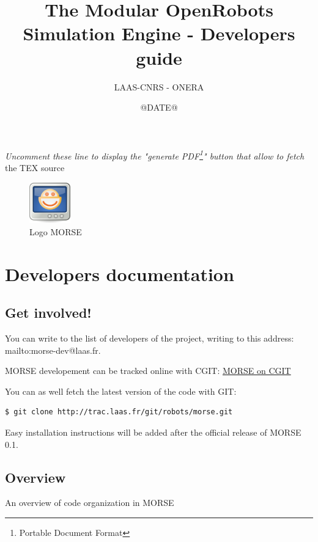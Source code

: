 \documentclass[twoside,a4paper,10pt]{report}
\title{The Modular OpenRobots Simulation Engine - Developers guide}
\author{LAAS-CNRS - ONERA}
\date{@DATE@}
\newcommand{\dokutitlelevelone}[1]{\chapter{#1}}
\newcommand{\dokutitleleveltwo}[1]{\section{#1}}
\newcommand{\dokufootnote}[1]{\footnote{#1}}
\newcommand{\dokuitalic}[1]{\textsl{#1}}
\begin{document}
\sffamily
\allsectionsfont{\sffamily}


\thispagestyle{empty}
\maketitle
\thispagestyle{empty}
\cleardoublepage
\tableofcontents
\newpage
\thispagestyle{plain}
\cleardoublepage
\newpage
\dokuitalic{Uncomment these line to display the "generate PDF\dokufootnote{Portable Document Format}" button that allow to fetch
}the TEX source


\begin{figure}[h]
\centering
\includegraphics[width=50pt]{openrobots-simulator.png}
\caption{Logo MORSE}
\end{figure}




\dokutitlelevelone{Developers documentation}
\label{cdb0de77c6812018f32abbd4e86045e9}%
\label{a80da1282f2c775bbc5f2c92c836968b}%

\dokutitleleveltwo{Get involved!}
\label{9250253a562d7334a71ae2812a91d3bd}%

You can write to the list of developers of the project, writing to this address: mailto:morse-dev@laas.fr.

MORSE developement can be tracked online with CGIT: \href{http://trac.laas.fr/git/morse}{ MORSE on CGIT}

You can as well fetch the latest version of the code with GIT:



\lstset{language=TeX}
\begin{lstlisting}
$ git clone http://trac.laas.fr/git/robots/morse.git

\end{lstlisting}
Easy installation instructions will be added after the official release of MORSE 0.1.


\dokutitleleveltwo{Overview}
\label{bce059749d61c1c247c303d0118d0d53}%
An overview of code organization in MORSE
\end{document}
